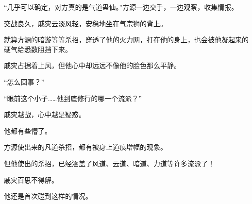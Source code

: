 \begin{this_body}
“几乎可以确定，对方真的是气道蛊仙。”方源一边交手，一边观察，收集情报。

交战良久，戚灾云淡风轻，安稳地坐在气宗狮的背上。

就算方源的暗漩等等杀招，穿透了他的火力网，打在他的身上，也会被他凝起来的硬气给悉数阻挡下来。

戚灾占据着上风，但他心中却远远不像他的脸色那么平静。

“怎么回事？”

“眼前这个小子……他到底修行的哪一个流派？”

戚灾越战，心中越是疑惑。

他都有些懵了。

方源使出来的凡道杀招，都有被身上道痕增幅的现象。

但他使出的杀招，已经涵盖了风道、云道、暗道、力道等许多流派了！

戚灾百思不得解。

他还是首次碰到这样的情况。

\end{this_body}

